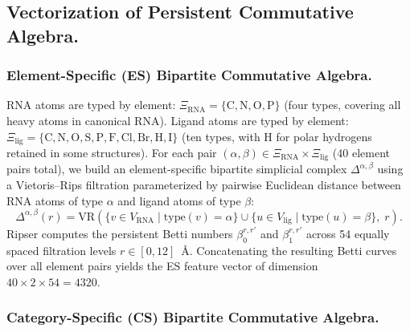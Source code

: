 \documentclass[10pt,twocolumn]{article}
\begin{document}
\subsection{Vectorization of Persistent Commutative Algebra.}

\subsubsection{Element-Specific (ES) Bipartite Commutative Algebra.}

RNA atoms are typed by element: $\Xi_{\mathrm{RNA}} = \{\mathrm{C, N, O, P}\}$
(four types, covering all heavy atoms in canonical RNA).
Ligand atoms are typed by element: $\Xi_{\mathrm{lig}} = \{\mathrm{C, N, O, S, P, F, Cl, Br, H, I}\}$
(ten types, with $\mathrm{H}$ for polar hydrogens retained in some structures).
For each pair $(\alpha, \beta) \in \Xi_{\mathrm{RNA}} \times \Xi_{\mathrm{lig}}$
(40 element pairs total), we build an element-specific bipartite simplicial complex
$\Delta^{\alpha,\beta}$ using a Vietoris--Rips filtration parameterized by
pairwise Euclidean distance between RNA atoms of type $\alpha$ and ligand atoms of type $\beta$:
\begin{equation}
\Delta^{\alpha,\beta}(r) = \mathrm{VR}\!\left(
  \{v \in V_{\mathrm{RNA}} \mid \mathrm{type}(v) = \alpha\}
  \cup
  \{u \in V_{\mathrm{lig}} \mid \mathrm{type}(u) = \beta\},\; r
\right).
\label{eq:es_complex}
\end{equation}
Ripser\cite{Bauer2021} computes the persistent Betti numbers $\beta_0^{r,r'}$ and
$\beta_1^{r,r'}$ across 54 equally spaced filtration levels $r \in [0, 12]$~\AA.
Concatenating the resulting Betti curves over all element pairs yields the
ES feature vector of dimension $40 \times 2 \times 54 = 4320$.


\subsubsection{Category-Specific (CS) Bipartite Commutative Algebra.}
\end{document}
